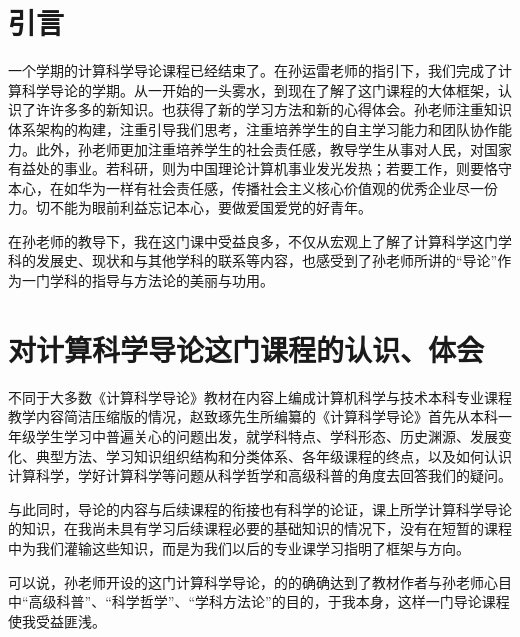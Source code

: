 \documentclass{article}
\begin{document}
\thispagestyle{empty}
\newpage
\setcounter{page}{1}
\section{引言}
一个学期的计算科学导论课程已经结束了。在孙运雷老师的指引下，我们完成了计算科学导论的学期。从一开始的一头雾水，到现在了解了这门课程的大体框架，认识了许许多多的新知识。也获得了新的学习方法和新的心得体会。孙老师注重知识体系架构的构建，注重引导我们思考，注重培养学生的自主学习能力和团队协作能力。此外，孙老师更加注重培养学生的社会责任感，教导学生从事对人民，对国家有益处的事业。若科研，则为中国理论计算机事业发光发热；若要工作，则要恪守本心，在如华为一样有社会责任感，传播社会主义核心价值观的优秀企业尽一份力。切不能为眼前利益忘记本心，要做爱国爱党的好青年。\par
在孙老师的教导下，我在这门课中受益良多，不仅从宏观上了解了计算科学这门学科的发展史、现状和与其他学科的联系等内容，也感受到了孙老师所讲的“导论”作为一门学科的指导与方法论的美丽与功用。

\section{对计算科学导论这门课程的认识、体会}
不同于大多数《计算科学导论》教材在内容上编成计算机科学与技术本科专业课程教学内容简洁压缩版的情况，赵致琢先生所编纂的《计算科学导论》首先从本科一年级学生学习中普遍关心的问题出发，就学科特点、学科形态、历史渊源、发展变化、典型方法、学习知识组织结构和分类体系、各年级课程的终点，以及如何认识计算科学，学好计算科学等问题从科学哲学和高级科普的角度去回答我们的疑问。\par
与此同时，导论的内容与后续课程的衔接也有科学的论证，课上所学计算科学导论的知识，在我尚未具有学习后续课程必要的基础知识的情况下，没有在短暂的课程中为我们灌输这些知识，而是为我们以后的专业课学习指明了框架与方向。\par
可以说，孙老师开设的这门计算科学导论，的的确确达到了教材作者与孙老师心目中“高级科普”、“科学哲学”、“学科方法论”的目的，于我本身，这样一门导论课程使我受益匪浅。
\end{document}
